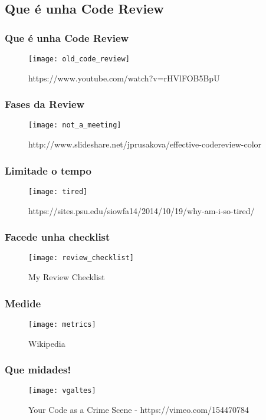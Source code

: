 \subsection{Que é unha Code Review}
\label{subsec:Que}

\begin{frame}
  \frametitle{Que é unha Code Review}
  \begin{figure}[ht]
    \texttt{[image: old\_code\_review]}
    \caption{https://www.youtube.com/watch?v=rHVlFOB5BpU}
  \end{figure}
\end{frame}

\begin{frame}
  \frametitle{Fases da Review}
  \begin{figure}[ht]
    \texttt{[image: not\_a\_meeting]}
    \caption{http://www.slideshare.net/jprusakova/effective-codereview-color}
  \end{figure}
\end{frame}

\begin{frame}
  \frametitle{Limitade o tempo}
  \begin{figure}[ht]
    \texttt{[image: tired]}
    \caption{https://sites.psu.edu/siowfa14/2014/10/19/why-am-i-so-tired/}
  \end{figure}
\end{frame}

\begin{frame}
  \frametitle{Facede unha checklist}
  \begin{figure}[ht]
    \texttt{[image: review\_checklist]}
    \caption{My Review Checklist}
  \end{figure}
\end{frame}

\begin{frame}
  \frametitle{Medide}
  \begin{figure}[ht]
    \texttt{[image: metrics]}
    \caption{Wikipedia}
  \end{figure}
\end{frame}

\begin{frame}
  \frametitle{Que midades!}
  \begin{figure}[ht]
    \texttt{[image: vgaltes]}
    \caption{Your Code as a Crime Scene - https://vimeo.com/154470784}
  \end{figure}
\end{frame}

